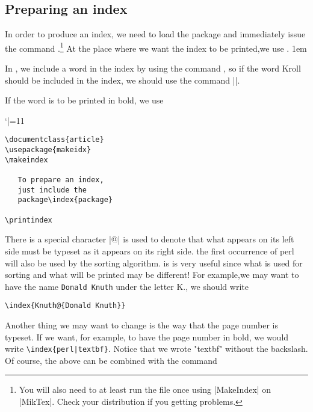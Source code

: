 \setlength{\columnsep}{2em}
\begin{multicols}{2}

\section{Preparing an index}

In order to produce an index, we need to load the
package   and immediately issue the command \cmd{\makeindex}.\footnote{You will also need to at least run the file once using |MakeIndex| on |MikTex|. Check your distribution if you getting problems.}
At the place where
we want the index to be printed,we use .
\parindent1em

In \latex, we include a word
in the index by using the command \cmd{\index}, so if the word Kroll should be included in
the index, we should use the command ||.

If the word is to be printed in bold, we use

\bgroup
 \catcode`|=11
\gdef\idxmain#1{%
   \def\idxmainentryi##1##2##3;{%
      \index{Kr0=\textbf{#1}|textbf}
    }
   \idxmainentryi#1;    
}  


\egroup

\idxmain{Kroll}




\begin{verbatim}
\documentclass{article}
\usepackage{makeidx}
\makeindex

   To prepare an index, 
   just include the
   package\index{package}

\printindex

\end{verbatim}



There is a  special character |@| is used to denote that what appears on its left side must be
typeset as it appears on its right side.  the first occurrence of perl will also be used
by the sorting algorithm. is is very useful since what is used for sorting and what
will be printed may be different! For example,we may want to have the name 
\texttt{Donald Knuth}  under the letter K., we should write


\verb+\index{Knuth@{Donald Knuth}}+

Another thing we may want to change is the way that the page number is typeset.
If we want, for example, to have the page number in bold, we would write
\verb+\index{perl|textbf}+.  Notice that we wrote "textbf"  without the backslash. Of course,
the above can be combined with the  command



\end{multicols}
